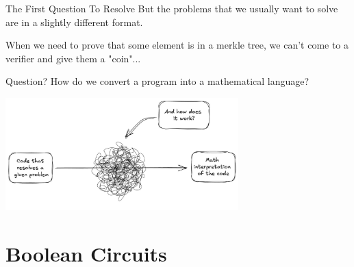 \documentclass{beamer}
\begin{document}
    \begin{frame}{The First Question To Resolve}
        But the problems that we usually want to solve are in a slightly different format.
        \pause

        \vspace{0.2cm}
        When we need to prove that some element is in a merkle tree, we can't come
        to a verifier and give them a "coin"...
        
        \pause
        \begin{alertblock}{Question?}
            How do we convert a program into a mathematical language?
        \end{alertblock}

        \center
        \includegraphics[width=9cm]{../presentations/images/lecture_8/exactcodetomathflow.jpg}
    \end{frame}

    \section{Boolean Circuits}
\end{document}
